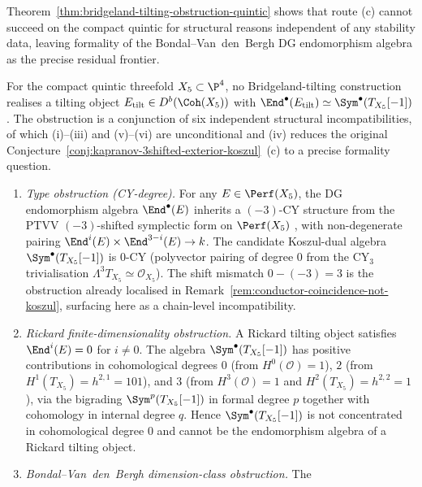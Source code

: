 \begin{remark}
Theorem~\ref{thm:bridgeland-tilting-obstruction-quintic} shows that
route (c) cannot succeed on the compact quintic for structural reasons
independent of any stability data, leaving formality of the
Bondal--Van~den~Bergh DG endomorphism algebra as the precise residual
frontier.
\end{remark}

\begin{theorem}
\label{thm:bridgeland-tilting-obstruction-quintic}
For the compact quintic threefold $X_5\subset \P^4$, no Bridgeland-tilting
construction realises a tilting object
$E_{\mathrm{tilt}}\in D^b(\Coh(X_5))$ with
$\End^\bullet(E_{\mathrm{tilt}})\simeq \Sym^\bullet(T_{X_5}[-1])$.
The obstruction is a conjunction of six independent structural
incompatibilities, of which (i)--(iii) and (v)--(vi) are unconditional
and (iv) reduces the original Conjecture~\ref{conj:kapranov-3shifted-exterior-koszul}~(c)
to a precise formality question.
\begin{enumerate}[label=\textup{(\roman*)}]
 \item \emph{Type obstruction (CY-degree).} For any
 $E\in \Perf(X_5)$, the DG endomorphism algebra $\End^\bullet(E)$
 inherits a $(-3)$-CY structure from the PTVV $(-3)$-shifted symplectic
 form on $\Perf(X_5)$ \cite{PTVV2013}, with non-degenerate pairing
 $\End^i(E)\times \End^{3-i}(E)\to k$. The candidate Koszul-dual algebra
 $\Sym^\bullet(T_{X_5}[-1])$ is $0$-CY (polyvector pairing of degree $0$
 from the $\mathrm{CY}_3$ trivialisation $\Lambda^3 T_{X_5}\simeq
 \mathcal{O}_{X_5}$). The shift mismatch $0-(-3) = 3$ is the obstruction
 already localised in Remark~\ref{rem:conductor-coincidence-not-koszul},
 surfacing here as a chain-level incompatibility.
 \item \emph{Rickard finite-dimensionality obstruction.} A Rickard
 tilting object \cite{Rickard1989} satisfies $\End^i(E) = 0$ for
 $i\neq 0$. The algebra $\Sym^\bullet(T_{X_5}[-1])$ has positive
 contributions in cohomological degrees $0$ (from $H^0(\mathcal{O}) = 1$),
 $2$ (from $H^1(T_{X_5}) = h^{2,1} = 101$), and $3$ (from $H^3(\mathcal{O})
 = 1$ and $H^2(T_{X_5}) = h^{2,2} = 1$), via the bigrading
 $\Sym^p(T_{X_5}[-1])$ in formal degree $p$ together with cohomology in
 internal degree $q$. Hence $\Sym^\bullet(T_{X_5}[-1])$ is not concentrated
 in cohomological degree $0$ and cannot be the endomorphism algebra of
 a Rickard tilting object.
 \item \emph{Bondal--Van~den~Bergh dimension-class obstruction.} The

\end{enumerate}
\end{theorem}
